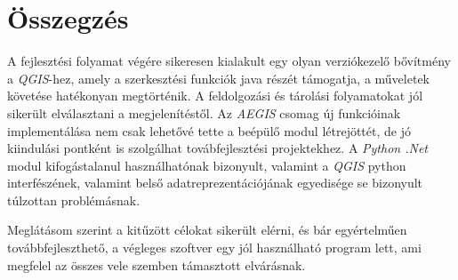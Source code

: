 \chapter{Összegzés}
\label{ch:sum}
A fejlesztési folyamat végére sikeresen kialakult egy olyan verziókezelő bővítmény a \emph{QGIS}-hez, amely a szerkesztési funkciók java részét támogatja, a műveletek követése hatékonyan megtörténik. A feldolgozási és tárolási folyamatokat jól sikerült elválasztani a megjelenítéstől. Az \emph{AEGIS} csomag új funkcióinak implementálása nem csak lehetővé tette a beépülő modul létrejöttét, de jó kiindulási pontként is szolgálhat továbfejlesztési projektekhez. A \emph{Python .Net} modul kifogástalanul használhatónak bizonyult, valamint a \emph{QGIS} python interfészének, valamint belső adatreprezentációjának egyedisége se bizonyult túlzottan problémásnak.

Meglátásom szerint a kitűzött célokat sikerült elérni, és bár egyértelműen továbbfejleszthető, a végleges szoftver egy jól használható program lett, ami megfelel az összes vele szemben támasztott elvárásnak.